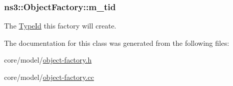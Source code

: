 \subsubsection[{\texorpdfstring{m\+\_\+tid}{m_tid}}]{ ns3\+::\+Object\+Factory\+::m\+\_\+tid\hspace{0.3cm}{\ttfamily [private]}}\hypertarget{classns3_1_1ObjectFactory_a8ca23503729ed332d29c5106d2e750f5}{}\label{classns3_1_1ObjectFactory_a8ca23503729ed332d29c5106d2e750f5}
The \hyperlink{classns3_1_1TypeId}{Type\+Id} this factory will create. 

The documentation for this class was generated from the following files\+:\begin{DoxyCompactItemize}
\item 
core/model/\hyperlink{object-factory_8h}{object-\/factory.\+h}\item 
core/model/\hyperlink{object-factory_8cc}{object-\/factory.\+cc}\end{DoxyCompactItemize}
